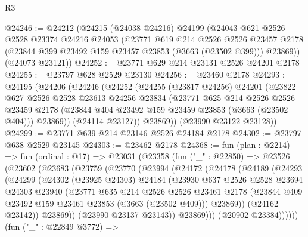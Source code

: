 \begin{lexlean}{R3}
\begin{coremodule}
@24246 := @24212
    (@24215
      (@24038 @24216)
      @24199
      (@24043
        @621
        @2526
        @2528
        @23374
        @24216
        @24053
        (@23771
          @619
          @214
          @2526
          @2526
          @23457
          @2178
          (@23844 @399 @23492 @159 @23457 @23853 (@3663 (@23502 @399)))
          @23869))
      (@24073 @23121))
@24252 := @23771 @629 @214 @23131 @2526 @24201 @2178
@24255 := @23797 @628 @2529 @23130
@24256 := @23460 @2178
@24293 := @24195
    (@24206
      (@24246
        (@24252
          (@24255
            (@23817 @24256)
            @24201
            (@23822
              @627
              @2526
              @2528
              @23613
              @24256
              @23834
              (@23771
                @625
                @214
                @2526
                @2526
                @23459
                @2178
                (@23844 @404 @23492 @159 @23459 @23853 (@3663 (@23502 @404)))
                @23869))
            (@24114 @23127))
          @23869))
      (@23990 @23122 @23128))
@24299 := @23771 @639 @214 @23146 @2526 @24184 @2178
@24302 := @23797 @638 @2529 @23145
@24303 := @23462 @2178
@24368 := fun (plan : @2214) =>
  fun (ordinal : @17) =>
  @23031
    (@23358
      (fun ("_" : @22850) =>
      @23526
        (@23602
          (@23683
            (@23759
              (@23770
                (@23994
                  (@24172
                    (@24178
                      (@24189
                        (@24293
                          (@24299
                            (@24302
                              (@23925 @24303)
                              @24184
                              (@23930
                                @637
                                @2526
                                @2528
                                @23694
                                @24303
                                @23940
                                (@23771
                                  @635
                                  @214
                                  @2526
                                  @2526
                                  @23461
                                  @2178
                                  (@23844 @409 @23492 @159 @23461 @23853 (@3663 (@23502 @409)))
                                  @23869))
                              (@24162 @23142))
                            @23869))
                        (@23990 @23137 @23143))
                      @23869)))
                (@20902 @23384))))))
      (fun ("_" : @22849 @3772) =>

\end{coremodule}
\end{lexlean}
